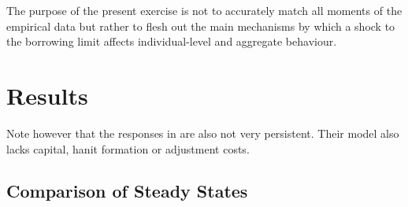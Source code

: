 \documentclass[12pt]{article}
\numberwithin{equation}{section} %
\begin{document}
The purpose of the present exercise is not to accurately match all moments of the empirical data but rather to flesh out the main mechanisms by which a shock to the borrowing limit affects individual-level and aggregate behaviour.

\section{Results}
\label{sec:results}

Note however that the responses in \textcite{gl2017} are also not very persistent. Their model also lacks capital, hanit formation or adjustment costs.

\subsection{Comparison of Steady States}
\label{sec:results-stst}
\end{document}
